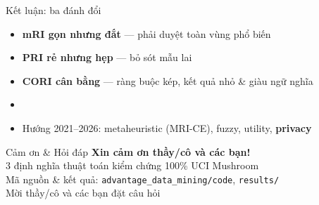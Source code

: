 \documentclass[aspectratio=169,11pt]{beamer}
\begin{document}
\begin{frame}{Kết luận: ba đánh đổi}
\begin{itemize}\itemsep0.7em
  \item \textbf{mRI gọn nhưng đắt} --- phải duyệt toàn vùng phổ biến
  \item \textbf{PRI rẻ nhưng hẹp} --- bỏ sót mẫu lai
  \item \textbf{CORI cân bằng} --- ràng buộc kép, kết quả nhỏ \& giàu ngữ nghĩa
  \item[]
  \item Hướng 2021--2026: metaheuristic (MRI-CE), fuzzy, utility, \textbf{privacy}
\end{itemize}
\end{frame}

\begin{frame}{Cảm ơn \& Hỏi đáp}
\centering
\vspace{1em}
{\Large\color{primary}\textbf{Xin cảm ơn thầy/cô và các bạn!}}\\[1.5em]
{\large 3 định nghĩa \quad\textbullet{} thuật toán \quad\textbullet\quad kiểm chứng 100\% \quad\textbullet\quad UCI Mushroom}\\[2em]
Mã nguồn \& kết quả: \texttt{advantage\_data\_mining/code}, \texttt{results/}\\[2em]
{\Large Mời thầy/cô và các bạn đặt câu hỏi}
\end{frame}
\end{document}
